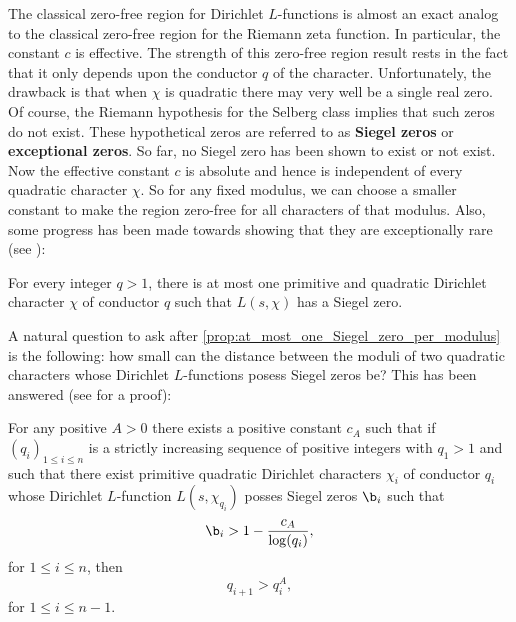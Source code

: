       The classical zero-free region for Dirichlet $L$-functions is almost an exact analog to the classical zero-free region for the Riemann zeta function. In particular, the constant $c$ is effective. The strength of this zero-free region result rests in the fact that it only depends upon the conductor $q$ of the character. Unfortunately, the drawback is that when $\chi$ is quadratic there may very well be a single real zero. Of course, the Riemann hypothesis for the Selberg class implies that such zeros do not exist. These hypothetical zeros are referred to as \textbf{Siegel zeros} or \textbf{exceptional zeros}. So far, no Siegel zero has been shown to exist or not exist. Now the effective constant $c$ is absolute and hence is independent of every quadratic character $\chi$. So for any fixed modulus, we can choose a smaller constant to make the region zero-free for all characters of that modulus. Also, some progress has been made towards showing that they are exceptionally rare (see \cite{montgomery2006multiplicative}):

      \begin{proposition}\label{prop:at_most_one_Siegel_zero_per_modulus}
        For every integer $q > 1$, there is at most one primitive and quadratic Dirichlet character $\chi$ of conductor $q$ such that $L(s,\chi)$ has a Siegel zero.
      \end{proposition}

      A natural question to ask after \cref{prop:at_most_one_Siegel_zero_per_modulus} is the following: how small can the distance between the moduli of two quadratic characters whose Dirichlet $L$-functions posess Siegel zeros be? This has been answered (see \cite{montgomery2006multiplicative} for a proof):

      \begin{proposition}\label{prop:modulus_distance_Siegel_zeros}
        For any positive $A > 0$ there exists a positive constant $c_{A}$ such that if $(q_{i})_{1 \le i \le n}$ is a strictly increasing sequence of positive integers with $q_{1} > 1$ and such that there exist primitive quadratic Dirichlet characters $\chi_{i}$ of conductor $q_{i}$ whose Dirichlet $L$-function $L(s,\chi_{q_{i}})$ posses Siegel zeros $\b_{i}$ such that
        \[
          \b_{i} > 1-\frac{c_{A}}{\log(q_{i})},
        \]
        for $1 \le i \le n$, then
        \[
          q_{i+1} > q_{i}^{A},
        \]
        for $1 \le i \le n-1$.
      \end{proposition}
